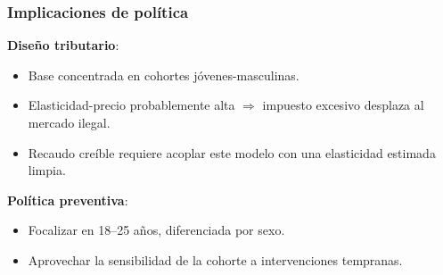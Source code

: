 \begin{frame}
\frametitle{Implicaciones de política}
\textbf{Diseño tributario}:
\begin{itemize}
    \item Base concentrada en cohortes jóvenes-masculinas.
    \item Elasticidad-precio probablemente alta $\Rightarrow$ impuesto excesivo desplaza al mercado ilegal.
    \item Recaudo creíble requiere acoplar este modelo con una elasticidad estimada limpia.
\end{itemize}
\vspace{0.3cm}
\textbf{Política preventiva}:
\begin{itemize}
    \item Focalizar en 18--25 años, diferenciada por sexo.
    \item Aprovechar la sensibilidad de la cohorte a intervenciones tempranas.
\end{itemize}
\end{frame}
